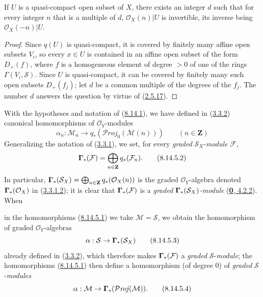 \begin{proposition}[8.14.4]
\label{II.8.14.4}
If $U$ is a quasi-compact open subset of $X$, there exists an integer $d$
such that for every integer $n$ that is a multiple of $d$,
$\mathcal{O}_X(n)|U$ is invertible, its inverse being
$\mathcal{O}_X(-n)|U$.
\end{proposition}

\begin{proof}
Since $q(U)$ is quasi-compact, it is covered by finitely many affine open
subsets $V_i$, so every $x\in U$ is contained in an affine open subset of the
form $D_+(f)$, where $f$ is a homogeneous element of degree $>0$ of one of the
rings $\Gamma(V_i,\mathcal{S})$. Since $U$ is quasi-compact, it can be
covered by finitely many such open subsets $D_+(f_j)$; let $d$ be a
common multiple of the degrees of the $f_j$. The number $d$ answers the
question by virtue of (\hyperref[II.2.5.17]{2.5.17}).
\end{proof}

\begin{env}[8.14.5]
\label{II.8.14.5}
With the hypotheses and notation of (\hyperref[II.8.14.1]{8.14.1}), we
have defined in (\hyperref[II.3.3.2]{3.3.2}) canonical homomorphisms of
$\mathcal{O}_Y$-modules
\begin{equation}
\label{II.8.14.5.1}
  \alpha_n:\mathcal{M}_n\to
  q_*(\mathcal{P}\mathit{roj}_0(\mathcal{M}(n)))
  \qquad(n\in\mathbf{Z})
\tag{8.14.5.1}
\end{equation}
Generalizing the notation of (\hyperref[II.3.3.1]{3.3.1}), we
set, for every \emph{graded} $\mathcal{S}_X$-\emph{module} $\mathcal{F}$,
\begin{equation}
\label{II.8.14.5.2}
  \boldsymbol{\Gamma}_*(\mathcal{F})=
  \bigoplus_{n\in\mathbf{Z}}q_*(\mathcal{F}_n).
\tag{8.14.5.2}
\end{equation}
In particular,
$\boldsymbol{\Gamma}_*(\mathcal{S}_X)=\bigoplus_{n\in\mathbf{Z}}q_*(\mathcal{O}_X(n))$
is the graded $\mathcal{O}_Y$-algebra denoted
$\boldsymbol{\Gamma}_*(\mathcal{O}_X)$ in
(\hyperref[II.3.3.1.2]{3.3.1.2}); it is clear that
$\boldsymbol{\Gamma}_*(\mathcal{F})$ is a \emph{graded $\boldsymbol{\Gamma}_*(\mathcal{S}_X)$-module}
(\hyperref[0.4.2.2]{\textbf{0}, 4.2.2}). When

in the homomorphisms (\hyperref[II.8.14.5.1]{8.14.5.1}) we take
$\mathcal{M}=\mathcal{S}$, we obtain the homomorphism of
graded $\mathcal{O}_Y$-algebras
\begin{equation}
\label{II.8.14.5.3}
  \alpha:\mathcal{S}\to\boldsymbol{\Gamma}_*(\mathcal{S}_X)
\tag{8.14.5.3}
\end{equation}
already defined in (\hyperref[II.3.3.2]{3.3.2}), which therefore makes
$\boldsymbol{\Gamma}_*(\mathcal{F})$ a \emph{graded} $\mathcal{S}$-\emph{module}; the homomorphisms
(\hyperref[II.8.14.5.1]{8.14.5.1}) then define a homomorphism (of
degree $0$) of \emph{graded} $\mathcal{S}$-\emph{modules}
\begin{equation}
\label{II.8.14.5.4}
  \alpha:\mathcal{M}\to\boldsymbol{\Gamma}_*(\mathcal{P}\mathit{roj}(\mathcal{M})).
\tag{8.14.5.4}
\end{equation}
\end{env}


